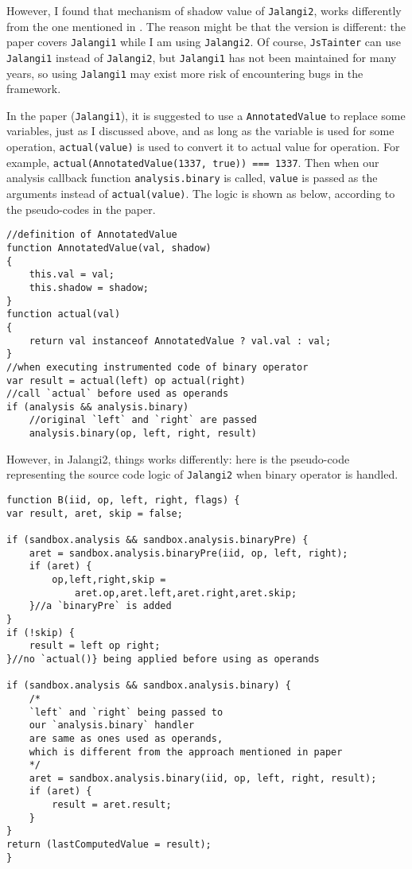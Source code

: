 However, I found that mechanism of shadow value of \texttt{Jalangi2}, works differently from the one mentioned in \citep{jalangipaper}. The reason might be that the version is different: the paper covers \texttt{Jalangi1} while I am using \texttt{Jalangi2}. Of course, \texttt{JsTainter} can use \texttt{Jalangi1} instead of \texttt{Jalangi2}, but \texttt{Jalangi1} has not been maintained for many years, so using \texttt{Jalangi1} may exist more risk of encountering bugs in the framework.

In the paper (\texttt{Jalangi1}), it is suggested to use a \texttt{AnnotatedValue} to replace some variables, just as I discussed above, and as long as the variable is used for some operation, \texttt{actual(value)} is used to convert it to actual value for operation. For example, \texttt{actual(AnnotatedValue(1337, true)) === 1337}.  Then when our analysis callback function \texttt{analysis.binary} is called, \texttt{value} is passed as the arguments instead of \texttt{actual(value)}. The logic is shown as below, according to the pseudo-codes in the paper.

\begin{verbatim}
//definition of AnnotatedValue
function AnnotatedValue(val, shadow)
{
    this.val = val;
    this.shadow = shadow;
}
function actual(val)
{
    return val instanceof AnnotatedValue ? val.val : val;
}
//when executing instrumented code of binary operator
var result = actual(left) op actual(right) 
//call `actual` before used as operands 
if (analysis && analysis.binary)
    //original `left` and `right` are passed
    analysis.binary(op, left, right, result)
\end{verbatim}


However, in Jalangi2, things works differently: here is the pseudo-code representing the source code logic of \texttt{Jalangi2} when binary operator is handled.

\begin{verbatim}
function B(iid, op, left, right, flags) {
var result, aret, skip = false;

if (sandbox.analysis && sandbox.analysis.binaryPre) {
    aret = sandbox.analysis.binaryPre(iid, op, left, right);
    if (aret) {
        op,left,right,skip =
            aret.op,aret.left,aret.right,aret.skip;
    }//a `binaryPre` is added
}
if (!skip) {
    result = left op right;
}//no `actual()} being applied before using as operands

if (sandbox.analysis && sandbox.analysis.binary) {
    /*
    `left` and `right` being passed to
    our `analysis.binary` handler
    are same as ones used as operands,
    which is different from the approach mentioned in paper
    */
    aret = sandbox.analysis.binary(iid, op, left, right, result);
    if (aret) {
        result = aret.result;
    }
}
return (lastComputedValue = result);
}
\end{verbatim}


